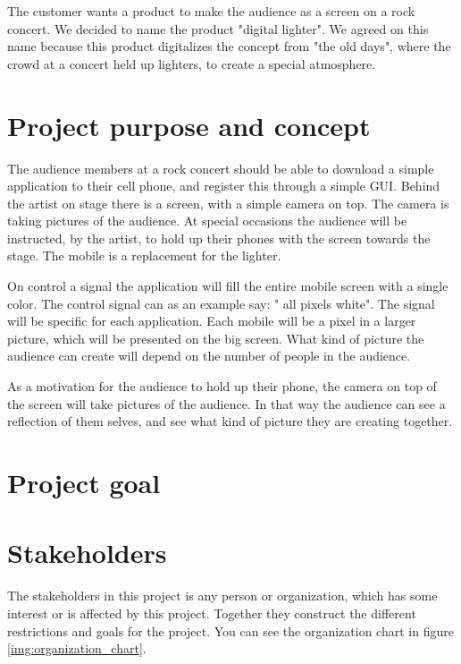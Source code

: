 The customer wants a product to make the audience as a screen on a rock concert. We decided to name the product "digital lighter". We agreed on this name because this product digitalizes the concept from "the old days", where the crowd at a concert held up lighters, to create a special atmosphere. 

\section{Project purpose and concept}

The audience members at a rock concert should be able to download a simple application to their cell phone, and register this through a simple GUI.
Behind the artist on stage there is a screen, with a simple camera on top. 
The camera is taking pictures of the audience. 
At special occasions the audience will be instructed, by the artist, to hold up their phones with the screen towards the stage. 
The mobile is a replacement for the lighter.  

On control a signal the application will fill the entire mobile screen with a single color.
The control signal can as an example say: " all pixels white". 
The signal will be specific for each application.
Each mobile will be a pixel in a larger picture, which will be presented on the big screen. 
What kind of picture the audience can create will depend on the number of people in the audience.   

As a motivation for the audience to hold up their phone, the camera on top of the screen will take pictures of the audience.
In that way the audience can see a reflection of them selves, and see what kind of picture they are creating together.

\section{Project goal}
\label{sec:project-goals}

\section{Stakeholders}

The stakeholders in this project is any person or organization, which has some interest or is affected by this project. Together they construct the different restrictions and goals for the project. 
You can see the organization chart in figure \ref{img:organization_chart}.

